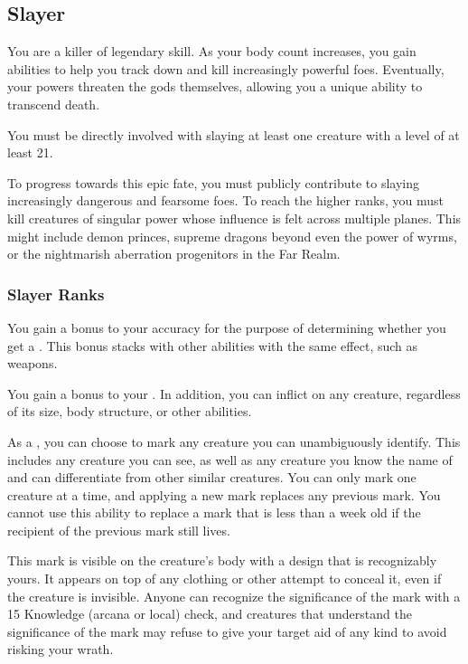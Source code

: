   \subsection{Slayer}
    You are a killer of legendary skill.
    As your body count increases, you gain abilities to help you track down and kill increasingly powerful foes.
    Eventually, your powers threaten the gods themselves, allowing you a unique ability to transcend death.

     You must be directly involved with slaying at least one  creature with a level of at least 21.

     To progress towards this epic fate, you must publicly contribute to slaying increasingly dangerous and fearsome foes.
    To reach the higher ranks, you must kill creatures of singular power whose influence is felt across multiple planes.
    This might include demon princes, supreme dragons beyond even the power of wyrms, or the nightmarish aberration progenitors in the Far Realm.

    \subsubsection{Slayer Ranks}
       You gain a  bonus to your accuracy for the purpose of determining whether you get a .
      This bonus stacks with other abilities with the same effect, such as  weapons.

       You gain a  bonus to your .
      In addition, you can inflict  on any creature, regardless of its size, body structure, or other abilities.

       As a , you can choose to mark any creature you can unambiguously identify.
      This includes any creature you can see, as well as any creature you know the name of and can differentiate from other similar creatures.
      You can only mark one creature at a time, and applying a new mark replaces any previous mark.
      You cannot use this ability to replace a mark that is less than a week old if the recipient of the previous mark still lives.

      This mark is visible on the creature's body with a design that is recognizably yours.
      It appears on top of any clothing or other attempt to conceal it, even if the creature is invisible.
      Anyone can recognize the significance of the mark with a  15 Knowledge (arcana or local) check, and creatures that understand the significance of the mark may refuse to give your target aid of any kind to avoid risking your wrath.

